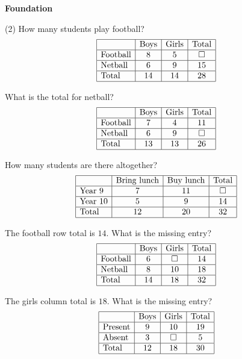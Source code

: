 \documentclass[17pt,a4paper,landscape]{extarticle}
\begin{document}
\sffamily
\boldmath

{\LARGE \textbf{Foundation}}
\begin{tasks}(2)
\task How many students play football?
\[
\begin{array}{|l|c|c|c|}
\hline
 & \text{Boys} & \text{Girls} & \text{Total} \\\hline
\text{Football} & 8 & 5 & \square \\\hline
\text{Netball} & 6 & 9 & 15 \\\hline
\text{Total} & 14 & 14 & 28 \\\hline
\end{array}
\]

\task What is the total for netball?
\[
\begin{array}{|l|c|c|c|}
\hline
 & \text{Boys} & \text{Girls} & \text{Total} \\\hline
\text{Football} & 7 & 4 & 11 \\\hline
\text{Netball} & 6 & 9 & \square \\\hline
\text{Total} & 13 & 13 & 26 \\\hline
\end{array}
\]

\task How many students are there altogether?
\[
\begin{array}{|l|c|c|c|}
\hline
 & \text{Bring lunch} & \text{Buy lunch} & \text{Total} \\\hline
\text{Year 9} & 7 & 11 & \square \\\hline
\text{Year 10} & 5 & 9 & 14 \\\hline
\text{Total} & 12 & 20 & 32 \\\hline
\end{array}
\]

\task The football row total is \mbox{$14$}. What is the missing entry?
\[
\begin{array}{|l|c|c|c|}
\hline
 & \text{Boys} & \text{Girls} & \text{Total} \\\hline
\text{Football} & 6 & \square & 14 \\\hline
\text{Netball} & 8 & 10 & 18 \\\hline
\text{Total} & 14 & 18 & 32 \\\hline
\end{array}
\]

\task The girls column total is \mbox{$18$}. What is the missing entry?
\[
\begin{array}{|l|c|c|c|}
\hline
 & \text{Boys} & \text{Girls} & \text{Total} \\\hline
\text{Present} & 9 & 10 & 19 \\\hline
\text{Absent} & 3 & \square & 5 \\\hline
\text{Total} & 12 & 18 & 30 \\\hline
\end{array}
\]


\end{tasks}
\end{document}
